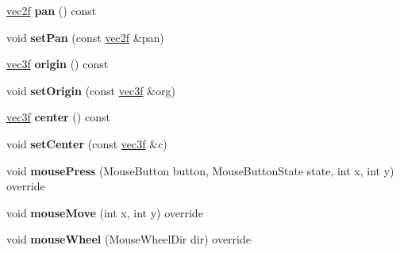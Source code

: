 \begin{DoxyCompactItemize}
\item 
\hypertarget{classps_1_1scene_1_1ArcBallCamera_a0b40beb8689d0db666b93746f3a473ab}{}\hyperlink{classps_1_1base_1_1Vec2}{vec2f} {\bfseries pan} () const \label{classps_1_1scene_1_1ArcBallCamera_a0b40beb8689d0db666b93746f3a473ab}

\item 
\hypertarget{classps_1_1scene_1_1ArcBallCamera_a7fcbb21e37c84b977f6d3b7d274d7d94}{}void {\bfseries set\+Pan} (const \hyperlink{classps_1_1base_1_1Vec2}{vec2f} \&pan)\label{classps_1_1scene_1_1ArcBallCamera_a7fcbb21e37c84b977f6d3b7d274d7d94}

\item 
\hypertarget{classps_1_1scene_1_1ArcBallCamera_a5ff35ac19e9a13be3b22508428369440}{}\hyperlink{classps_1_1base_1_1Vec3}{vec3f} {\bfseries origin} () const \label{classps_1_1scene_1_1ArcBallCamera_a5ff35ac19e9a13be3b22508428369440}

\item 
\hypertarget{classps_1_1scene_1_1ArcBallCamera_a1f71cb3e9521b2c3a5a0e57cfecd2420}{}void {\bfseries set\+Origin} (const \hyperlink{classps_1_1base_1_1Vec3}{vec3f} \&org)\label{classps_1_1scene_1_1ArcBallCamera_a1f71cb3e9521b2c3a5a0e57cfecd2420}

\item 
\hypertarget{classps_1_1scene_1_1ArcBallCamera_aae3bf9d81cc09964a94fcc2a385ad5cf}{}\hyperlink{classps_1_1base_1_1Vec3}{vec3f} {\bfseries center} () const \label{classps_1_1scene_1_1ArcBallCamera_aae3bf9d81cc09964a94fcc2a385ad5cf}

\item 
\hypertarget{classps_1_1scene_1_1ArcBallCamera_a3f76e247cc639117c8295579024ba173}{}void {\bfseries set\+Center} (const \hyperlink{classps_1_1base_1_1Vec3}{vec3f} \&c)\label{classps_1_1scene_1_1ArcBallCamera_a3f76e247cc639117c8295579024ba173}

\item 
\hypertarget{classps_1_1scene_1_1ArcBallCamera_a563746bfcff0743deda9be92a5017ec9}{}void {\bfseries mouse\+Press} (Mouse\+Button button, Mouse\+Button\+State state, int x, int y) override\label{classps_1_1scene_1_1ArcBallCamera_a563746bfcff0743deda9be92a5017ec9}

\item 
\hypertarget{classps_1_1scene_1_1ArcBallCamera_ad3337aef66263f061a69ec65a798515d}{}void {\bfseries mouse\+Move} (int x, int y) override\label{classps_1_1scene_1_1ArcBallCamera_ad3337aef66263f061a69ec65a798515d}

\item 
\hypertarget{classps_1_1scene_1_1ArcBallCamera_a925d91c15cdf870043f0e5ec53177ad9}{}void {\bfseries mouse\+Wheel} (Mouse\+Wheel\+Dir dir) override\label{classps_1_1scene_1_1ArcBallCamera_a925d91c15cdf870043f0e5ec53177ad9}


\end{DoxyCompactItemize}
